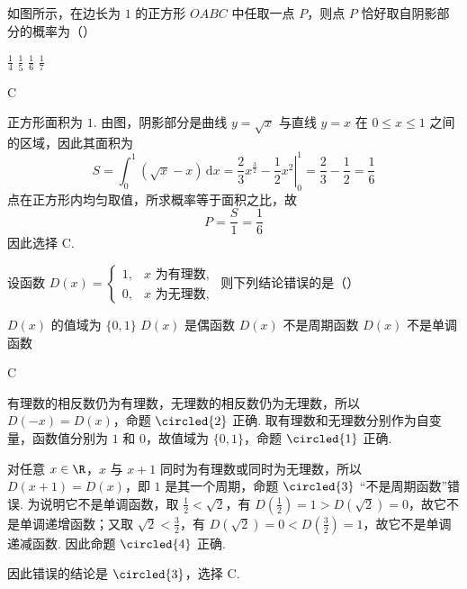 \begin{problem}
如图所示，在边长为 \(1\) 的正方形 \(OABC\) 中任取一点 \(P\)，则点 \(P\) 恰好取自阴影部分的概率为（\quad）


\choices
    {\(\frac{1}{4}\)}
    {\(\frac{1}{5}\)}
    {\(\frac{1}{6}\)}
    {\(\frac{1}{7}\)}
\end{problem}

\begin{answer}
C
\end{answer}

\begin{solution}
正方形面积为 \(1\). 由图，阴影部分是曲线 \(y=\sqrt{x}\) 与直线 \(y=x\) 在 \(0\leqslant x\leqslant1\) 之间的区域，因此其面积为
\[
S=\int_{0}^{1}(\sqrt{x}-x)\,\mathrm{d}x
=\left.\frac23x^{\frac{3}{2}}-\frac12x^{2}\right|_{0}^{1}
=\frac23-\frac12=\frac16
\]
点在正方形内均匀取值，所求概率等于面积之比，故
\[
P=\frac{S}{1}=\frac16
\]
因此选择 C.
\end{solution}

\begin{problem}
设函数 \(D(x) = \begin{cases}
1, & x\text{ 为有理数},\\
0, & x\text{ 为无理数},
\end{cases}\) 则下列结论错误的是（\quad）

\choices
    {\(D(x)\) 的值域为 \(\{0,1\}\)}
    {\(D(x)\) 是偶函数}
    {\(D(x)\) 不是周期函数}
    {\(D(x)\) 不是单调函数}
\end{problem}

\begin{answer}
C
\end{answer}

\begin{solution}
有理数的相反数仍为有理数，无理数的相反数仍为无理数，所以 \(D(-x)=D(x)\)，命题 \(\circled{2}\) 正确. 取有理数和无理数分别作为自变量，函数值分别为 \(1\) 和 \(0\)，故值域为 \(\{0,1\}\)，命题 \(\circled{1}\) 正确.

对任意 \(x\in\R\)，\(x\) 与 \(x+1\) 同时为有理数或同时为无理数，所以 \(D(x+1)=D(x)\)，即 \(1\) 是其一个周期，命题 \(\circled{3}\) “不是周期函数”错误. 为说明它不是单调函数，取
\(\frac12<\sqrt2\)，有 \(D(\frac12)=1>D(\sqrt2)=0\)，故它不是单调递增函数；又取 \(\sqrt2<\frac32\)，有 \(D(\sqrt2)=0<D(\frac32)=1\)，故它不是单调递减函数. 因此命题 \(\circled{4}\) 正确.

因此错误的结论是 \(\circled{3}\)，选择 C.
\end{solution}

